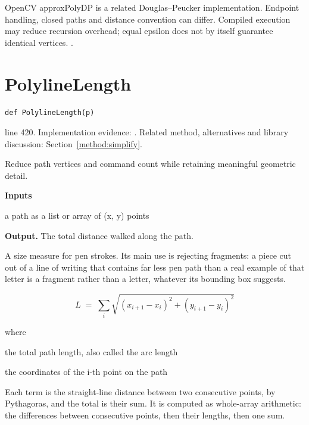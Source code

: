 OpenCV approxPolyDP is a related Douglas--Peucker implementation. Endpoint handling, closed paths and distance convention can differ. Compiled execution may reduce recursion overhead; equal epsilon does not by itself guarantee identical vertices. \cite{douglaspeucker1973,opencvshape}.


\section{PolylineLength}\label{fn:segment:PolylineLength}
\begin{lstlisting}[style=sig]
def PolylineLength(p)
\end{lstlisting}
 line 420. Implementation evidence: \cite{code2026}. Related method, alternatives and library discussion: Section~\ref{method:simplify}.


Reduce path vertices and command count while retaining meaningful geometric detail.




\noindent\textbf{Inputs}
\begin{description}[leftmargin=2.2em,style=nextline,font=\normalfont\ttfamily]\setlength\itemsep{1pt}
  \item[{p}] \normalfont a path as a list or array of (x, y) points
\end{description}

\noindent\textbf{Output.} The total distance walked along the path.


A size measure for pen strokes. Its main use is rejecting fragments: a piece cut out of a line of writing that contains far less pen path than a real example of that letter is a fragment rather than a letter, whatever its bounding box suggests.



\begin{equation}
L \;=\; \sum_{i} \sqrt{(x_{i+1}-x_i)^2 + (y_{i+1}-y_i)^2}
\end{equation}

\noindent where
\begin{description}[leftmargin=2.4em,style=nextline,font=\normalfont\ttfamily]\setlength\itemsep{1pt}
  \item[{$L$}] \normalfont the total path length, also called the arc length
  \item[{$x_i,\, y_i$}] \normalfont the coordinates of the i-th point on the path
\end{description}
Each term is the straight-line distance between two consecutive points, by Pythagoras, and the total is their sum. It is computed as whole-array arithmetic: the differences between consecutive points, then their lengths, then one sum.


